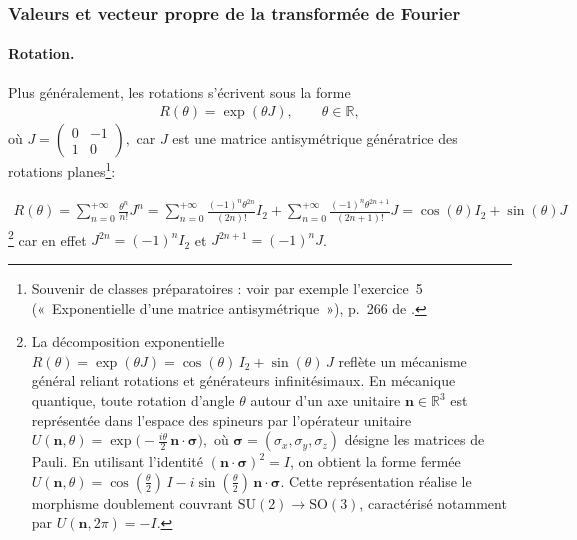 \subsubsection{Valeurs et vecteur propre de la transformée de Fourier}

\paragraph{Rotation.}

Plus généralement, les rotations s’écrivent sous la forme
\begin{eqnarray}
    R(\theta)=\exp(\theta J), \qquad \theta \in \mathbb{R},
\end{eqnarray}
où
\(
J =
\begin{pmatrix}
0 & -1 \\
1 & 0
\end{pmatrix},
\)
car $J$ est une matrice antisymétrique génératrice des rotations planes\footnote{Souvenir de classes préparatoires : voir par exemple l’exercice~5 («~Exponentielle d’une matrice antisymétrique~»), p.~266 de \cite{GourdonAlgebre}.}:
 
\begin{eqnarray}
    R(\theta) = \sum_{n=0}^{+\infty} \frac{\theta^n}{n!}J^n = \sum_{n=0}^{+\infty} \frac{(-1)^n\theta^{2n}}{(2n)!}I_2 +  \sum_{n=0}^{+\infty}\frac{(-1)^n\theta^{2n+1}}{(2n+1)!}J = \cos(\theta)I_2 + \sin(\theta)J
\end{eqnarray}
\footnote{%
La décomposition exponentielle
\(
R(\theta)=\exp(\theta J)=\cos(\theta)\,I_2+\sin(\theta)\,J
\)
reflète un mécanisme général reliant rotations et générateurs infinitésimaux. 
En mécanique quantique, toute rotation d’angle \(\theta\) autour d’un axe unitaire 
\(\boldsymbol n\in\mathbb R^3\) est représentée dans l’espace des spineurs par l’opérateur unitaire
\(
U(\boldsymbol n,\theta)=\exp\!\big(-\tfrac{i\theta}{2}\,\boldsymbol n\cdot\boldsymbol\sigma\big),
\)
où \(\boldsymbol\sigma=(\sigma_x,\sigma_y,\sigma_z)\) désigne les matrices de Pauli. 
En utilisant l’identité \((\boldsymbol n\cdot\boldsymbol\sigma)^2=I\), on obtient la forme fermée
\(
U(\boldsymbol n,\theta)=\cos(\tfrac{\theta}{2})\,I
-i\sin(\tfrac{\theta}{2})\,\boldsymbol n\cdot\boldsymbol\sigma.
\)
Cette représentation réalise le morphisme doublement couvrant \(\mathrm{SU}(2)\to\mathrm{SO}(3)\),
caractérisé notamment par \(U(\boldsymbol n,2\pi)=-I\).}
car en effet $J^{2n} = (-1)^n I_2$ et $J^{2n+1} = (-1)^n J$.






